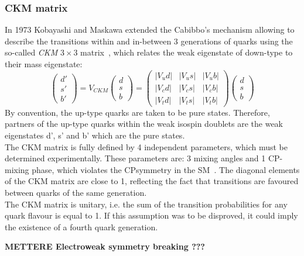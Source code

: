 \subsubsection{CKM matrix}
\label{sec:ckm}
In 1973 Kobayashi and Maskawa extended the Cabibbo's mechanism allowing to describe the transitions within and in-between 3 generations of quarks
using the so-called \textit{CKM} $3\times3$ matrix~\cite{cabibbo,ckm}, which relates the weak eigenstate of down-type to their mass eigenstate:
\begin{equation}
	\begin{pmatrix}
	d' \\ 
	s' \\ 
	b' 
	\end{pmatrix} 
	= V_{CKM}
	\begin{pmatrix}
	d \\ 
	s \\ 
	b
	\end{pmatrix} 
	=
	\begin{pmatrix}
	|V_ud| & |V_us| & |V_ub| \\ 
	|V_cd| & |V_cs| & |V_cb| \\ 
	|V_td| & |V_ts|  &| V_tb|
	\end{pmatrix} 
	\begin{pmatrix}
	d \\ 
	s \\ 
	b
	\end{pmatrix} 
\end{equation}
By  convention, the up-type quarks are taken to be pure states.
Therefore, partners of the up-type quarks within the weak isospin doublets are the weak eigenstates d’, s’ and b’ which are the pure states. \\
The CKM matrix is fully defined by 4 independent parameters, which must be determined experimentally. These parameters are: 3 mixing angles and 1 CP-mixing
phase, which violates the CP\footnotemark symmetry in the SM~\cite{cp_vio}.
The diagonal elements of the CKM matrix are close to 1, reflecting the fact that transitions are favoured between quarks of the same generation. \\
The CKM matrix is unitary, i.e. the sum of the transition probabilities for any quark flavour is equal to 1. If this assumption was to be disproved, 
it could imply the existence of a fourth quark generation.

\vspace{1cm}
\textbf{METTERE Electroweak symmetry breaking ???}


